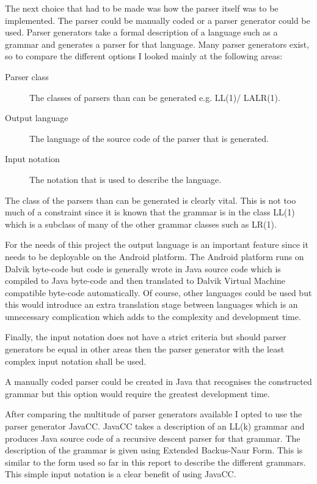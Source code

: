 The next choice that had to be made was how the parser itself was to be implemented. The parser could be manually coded or a parser generator could be used. Parser generators take a formal description of a language such as a grammar and generates a parser for that language. Many parser generators exist, so to compare the different options I looked mainly at the following areas:
\begin{description}
\item[Parser class] The classes of parsers than can be generated e.g. LL(1)/ LALR(1).
\item[Output language] The language of the source code of the parser that is generated.
\item[Input notation] The notation that is used to describe the language.
\end{description}

The class of the parsers than can be generated is clearly vital. This is not too much of a constraint since it is known that the grammar is in the class LL(1) which is a subclass of many of the other grammar classes such as LR(1).

For the needs of this project the output language is an important feature since it needs to be deployable on the Android platform. The Android platform runs on Dalvik byte-code but code is generally wrote in Java source code which is compiled to Java byte-code and then translated to Dalvik Virtual Machine compatible byte-code automatically. Of course, other languages could be used but this would introduce an extra translation stage between languages which is an unnecessary complication which adds to the complexity and development time. 

Finally, the input notation does not have a strict criteria but should parser generators be equal in other areas then the parser generator with the least complex input notation shall be used.

A manually coded parser could be created in Java that recognises the constructed grammar but this option would require the greatest development time.

After comparing the multitude of parser generators available I opted to use the parser generator JavaCC. JavaCC takes a description of an LL(k) grammar and produces Java source code of a recursive descent parser for that grammar. The description of the grammar is given using Extended Backus-Naur Form. This is similar to the form used so far in this report to describe the different grammars. This simple input notation is a clear benefit of using JavaCC.

